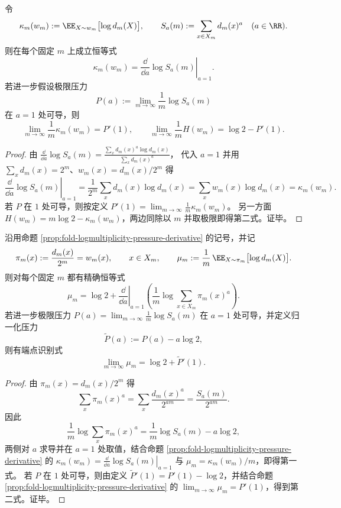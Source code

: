 \begin{proposition}[对数多重度的压力导数恒等式]\label{prop:fold-logmultiplicity-pressure-derivative}
令
\[
\kappa_m(w_m):=\EE_{X\sim w_m}\bigl[\log d_m(X)\bigr],
\qquad
S_a(m):=\sum_{x\in X_m}d_m(x)^a\quad(a\in\RR).
\]
则在每个固定 \(m\) 上成立恒等式
\[
\kappa_m(w_m)=\left.\frac{\dd}{\dd a}\log S_a(m)\right|_{a=1}.
\]
若进一步假设极限压力
\[
P(a):=\lim_{m\to\infty}\frac{1}{m}\log S_a(m)
\]
在 \(a=1\) 处可导，则
\[
\lim_{m\to\infty}\frac{1}{m}\kappa_m(w_m)=P'(1),
\qquad
\lim_{m\to\infty}\frac{1}{m}H(w_m)=\log 2-P'(1).
\]
\end{proposition}
\begin{proof}
由
\(
\frac{\dd}{\dd a}\log S_a(m)=\frac{\sum_x d_m(x)^a\log d_m(x)}{\sum_x d_m(x)^a}
\)，
代入 \(a=1\) 并用 \(\sum_x d_m(x)=2^m\)、\(w_m(x)=d_m(x)/2^m\) 得
\[
\left.\frac{\dd}{\dd a}\log S_a(m)\right|_{a=1}
=\frac{1}{2^m}\sum_x d_m(x)\log d_m(x)
=\sum_x w_m(x)\log d_m(x)
=\kappa_m(w_m).
\]
若 \(P\) 在 \(1\) 处可导，则按定义
\(
P'(1)=\lim_{m\to\infty}\frac{1}{m}\kappa_m(w_m)
\)。
另一方面
\(
H(w_m)=m\log 2-\kappa_m(w_m)
\)，两边同除以 \(m\) 并取极限即得第二式。证毕。
\end{proof}

\begin{corollary}[归一化压力端点导数识别平均对数多重度]\label{cor:fold-logmultiplicity-normalized-pressure-derivative}
沿用命题 \ref{prop:fold-logmultiplicity-pressure-derivative} 的记号，并记
\[
\pi_m(x):=\frac{d_m(x)}{2^m}=w_m(x),\qquad x\in X_m,
\qquad
\mu_m:=\frac{1}{m}\,\EE_{X\sim \pi_m}\bigl[\log d_m(X)\bigr].
\]
则对每个固定 \(m\) 都有精确恒等式
\[
\mu_m=\log 2+\left.\frac{\dd}{\dd a}\right|_{a=1}\left(\frac{1}{m}\log\sum_{x\in X_m}\pi_m(x)^a\right).
\]
若进一步极限压力 \(P(a)=\lim_{m\to\infty}\frac{1}{m}\log S_a(m)\) 在 \(a=1\) 处可导，并定义归一化压力
\[
\widetilde P(a):=P(a)-a\log 2,
\]
则有端点识别式
\[
\lim_{m\to\infty}\mu_m=\log 2+\widetilde P'(1).
\]
\end{corollary}
\begin{proof}
由 \(\pi_m(x)=d_m(x)/2^m\) 得
\[
\sum_x \pi_m(x)^a=\sum_x \frac{d_m(x)^a}{2^{am}}=\frac{S_a(m)}{2^{am}}.
\]
因此
\[
\frac{1}{m}\log\sum_x\pi_m(x)^a=\frac{1}{m}\log S_a(m)-a\log 2,
\]
两侧对 \(a\) 求导并在 \(a=1\) 处取值，结合命题 \ref{prop:fold-logmultiplicity-pressure-derivative} 的
\(
\kappa_m(w_m)=\left.\frac{\dd}{\dd a}\log S_a(m)\right|_{a=1}
\)
与 \(\mu_m=\kappa_m(w_m)/m\)，即得第一式。
若 \(P\) 在 \(1\) 处可导，则由定义 \(\widetilde P'(1)=P'(1)-\log2\)，并结合命题 \ref{prop:fold-logmultiplicity-pressure-derivative} 的 \(\lim_{m\to\infty}\mu_m=P'(1)\)，得到第二式。证毕。
\end{proof}

